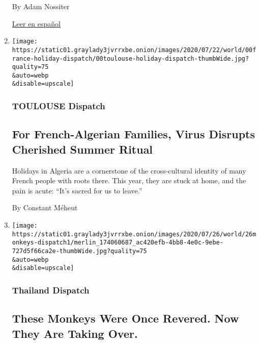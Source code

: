 \begin{enumerate}
  By Adam Nossiter

  \href{https://www.nytimes3xbfgragh.onion/es/2020/07/28/espanol/mundo/vino-blanco-alsacia-coronavirus.html}{Leer
  en español}
\item
  \href{/2020/07/26/world/europe/france-algeria-summer-vacations.html}{}

  \texttt{[image: https://static01.graylady3jvrrxbe.onion/images/2020/07/22/world/00france-holiday-dispatch/00toulouse-holiday-dispatch-thumbWide.jpg?quality=75\\\&auto=webp\\\&disable=upscale]}

  \hypertarget{toulouse-dispatch}{%
  \subsubsection{TOULOUSE Dispatch}\label{toulouse-dispatch}}

  \hypertarget{for-french-algerian-families-virus-disrupts-cherished-summer-ritual}{%
  \subsection{For French-Algerian Families, Virus Disrupts Cherished
  Summer
  Ritual}\label{for-french-algerian-families-virus-disrupts-cherished-summer-ritual}}

  Holidays in Algeria are a cornerstone of the cross-cultural identity
  of many French people with roots there. This year, they are stuck at
  home, and the pain is acute: ``It's sacred for us to leave.''

  By Constant Méheut
\item
  \href{/2020/07/25/world/asia/thailand-monkeys.html}{}

  \texttt{[image: https://static01.graylady3jvrrxbe.onion/images/2020/07/26/world/26monkeys-dispatch1/merlin\_174060687\_ac420efb-4bb8-4e0c-9ebe-727d5f66ca2e-thumbWide.jpg?quality=75\\\&auto=webp\\\&disable=upscale]}

  \hypertarget{thailand-dispatch}{%
  \subsubsection{Thailand Dispatch}\label{thailand-dispatch}}

  \hypertarget{these-monkeys-were-once-revered-now-they-are-taking-over}{%
  \subsection{These Monkeys Were Once Revered. Now They Are Taking
  Over.}\label{these-monkeys-were-once-revered-now-they-are-taking-over}}


\end{enumerate}
